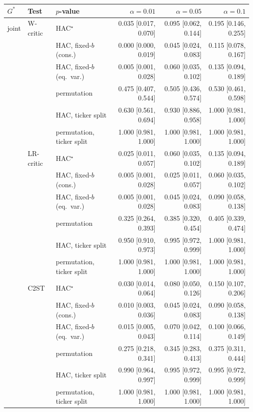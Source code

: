 \begin{tabular}{lllrrr}
\toprule
$G^*$ & Test & $p$-value & $\alpha=0.01$ & $\alpha=0.05$ & $\alpha=0.1$ \\
\midrule
joint & W-critic & HAC$^{\star}$ & 0.035 [0.017, 0.070] & 0.095 [0.062, 0.144] & 0.195 [0.146, 0.255] \\
 &  & HAC, fixed-$b$ (cons.) & 0.000 [0.000, 0.019] & 0.045 [0.024, 0.083] & 0.115 [0.078, 0.167] \\
 &  & HAC, fixed-$b$ (eq.\ var.) & 0.005 [0.001, 0.028] & 0.060 [0.035, 0.102] & 0.135 [0.094, 0.189] \\
 &  & permutation & 0.475 [0.407, 0.544] & 0.505 [0.436, 0.574] & 0.530 [0.461, 0.598] \\
 &  & HAC, ticker split & 0.630 [0.561, 0.694] & 0.930 [0.886, 0.958] & 1.000 [0.981, 1.000] \\
 &  & permutation, ticker split & 1.000 [0.981, 1.000] & 1.000 [0.981, 1.000] & 1.000 [0.981, 1.000] \\
 & LR-critic & HAC$^{\star}$ & 0.025 [0.011, 0.057] & 0.060 [0.035, 0.102] & 0.135 [0.094, 0.189] \\
 &  & HAC, fixed-$b$ (cons.) & 0.005 [0.001, 0.028] & 0.025 [0.011, 0.057] & 0.060 [0.035, 0.102] \\
 &  & HAC, fixed-$b$ (eq.\ var.) & 0.005 [0.001, 0.028] & 0.045 [0.024, 0.083] & 0.090 [0.058, 0.138] \\
 &  & permutation & 0.325 [0.264, 0.393] & 0.385 [0.320, 0.454] & 0.405 [0.339, 0.474] \\
 &  & HAC, ticker split & 0.950 [0.910, 0.973] & 0.995 [0.972, 0.999] & 1.000 [0.981, 1.000] \\
 &  & permutation, ticker split & 1.000 [0.981, 1.000] & 1.000 [0.981, 1.000] & 1.000 [0.981, 1.000] \\
 & C2ST & HAC$^{\star}$ & 0.030 [0.014, 0.064] & 0.080 [0.050, 0.126] & 0.150 [0.107, 0.206] \\
 &  & HAC, fixed-$b$ (cons.) & 0.010 [0.003, 0.036] & 0.045 [0.024, 0.083] & 0.090 [0.058, 0.138] \\
 &  & HAC, fixed-$b$ (eq.\ var.) & 0.015 [0.005, 0.043] & 0.070 [0.042, 0.114] & 0.100 [0.066, 0.149] \\
 &  & permutation & 0.275 [0.218, 0.341] & 0.345 [0.283, 0.413] & 0.375 [0.311, 0.444] \\
 &  & HAC, ticker split & 0.990 [0.964, 0.997] & 0.995 [0.972, 0.999] & 0.995 [0.972, 0.999] \\
 &  & permutation, ticker split & 1.000 [0.981, 1.000] & 1.000 [0.981, 1.000] & 1.000 [0.981, 1.000] \\

\end{tabular}
